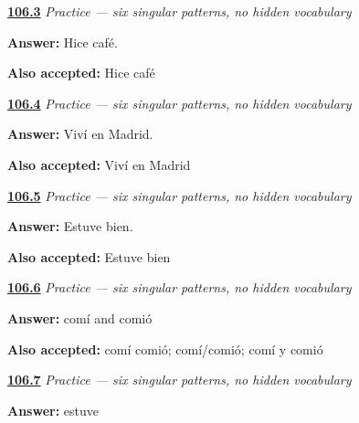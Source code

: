 \noindent\begin{minipage}[t]{\linewidth}
\raggedright
\hyperlink{review-ES-C15-practice-hice-cafe}{\textbf{106.3}} \emph{Practice — six singular patterns, no hidden vocabulary}\par
\small \textbf{Answer:} Hice café.\par
\footnotesize \textbf{Also accepted:} Hice café
\end{minipage}\par\medskip

\noindent\begin{minipage}[t]{\linewidth}
\raggedright
\hyperlink{review-ES-C15-practice-vivi-madrid}{\textbf{106.4}} \emph{Practice — six singular patterns, no hidden vocabulary}\par
\small \textbf{Answer:} Viví en Madrid.\par
\footnotesize \textbf{Also accepted:} Viví en Madrid
\end{minipage}\par\medskip

\noindent\begin{minipage}[t]{\linewidth}
\raggedright
\hyperlink{review-ES-C15-practice-estuve-bien}{\textbf{106.5}} \emph{Practice — six singular patterns, no hidden vocabulary}\par
\small \textbf{Answer:} Estuve bien.\par
\footnotesize \textbf{Also accepted:} Estuve bien
\end{minipage}\par\medskip

\noindent\begin{minipage}[t]{\linewidth}
\raggedright
\hyperlink{review-ES-C15-practice-accent-contrast}{\textbf{106.6}} \emph{Practice — six singular patterns, no hidden vocabulary}\par
\small \textbf{Answer:} comí and comió\par
\footnotesize \textbf{Also accepted:} comí comió; comí/comió; comí y comió
\end{minipage}\par\medskip

\noindent\begin{minipage}[t]{\linewidth}
\raggedright
\hyperlink{review-ES-C15-practice-history-match}{\textbf{106.7}} \emph{Practice — six singular patterns, no hidden vocabulary}\par
\small \textbf{Answer:} estuve\par
\end{minipage}\par\medskip

